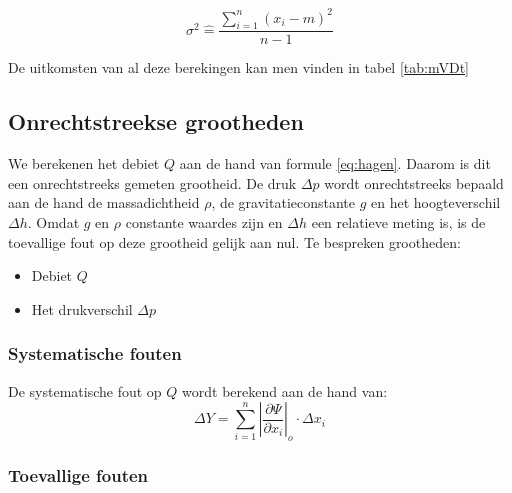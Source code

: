\begin{equation}
    \sigma^{2} \hat{=} \frac{\sum\limits_{i=1}^n (x_i - m)^2}{n - 1}
\end{equation}

De uitkomsten van al deze berekingen kan men vinden 
in tabel \ref{tab:mVDt}

\subsection{Onrechtstreekse grootheden}

We berekenen het debiet $Q$ aan de hand van formule \eqref{eq:hagen}. Daarom is dit een onrechtstreeks gemeten grootheid.
De druk $\Delta p$ wordt onrechtstreeks bepaald aan de hand de massadichtheid $\rho$, de gravitatieconstante $g$ en het hoogteverschil $\Delta h$. Omdat $g$ en $\rho$ constante waardes zijn en $\Delta h$ een relatieve meting is, is de toevallige fout op deze grootheid gelijk aan nul.
Te bespreken grootheden:
\begin{itemize}
    \item Debiet $Q$
    \item Het drukverschil $\Delta p$
\end{itemize}

\subsubsection{Systematische fouten}
De systematische fout op $Q$ wordt berekend aan de hand van:
\begin{equation}
    \Delta Y = \sum\limits_{i=1}^n \left|\frac{\partial \Psi}{\partial x_i}\right|_o \cdot \Delta x_i
\end{equation}

\subsubsection{Toevallige fouten}

